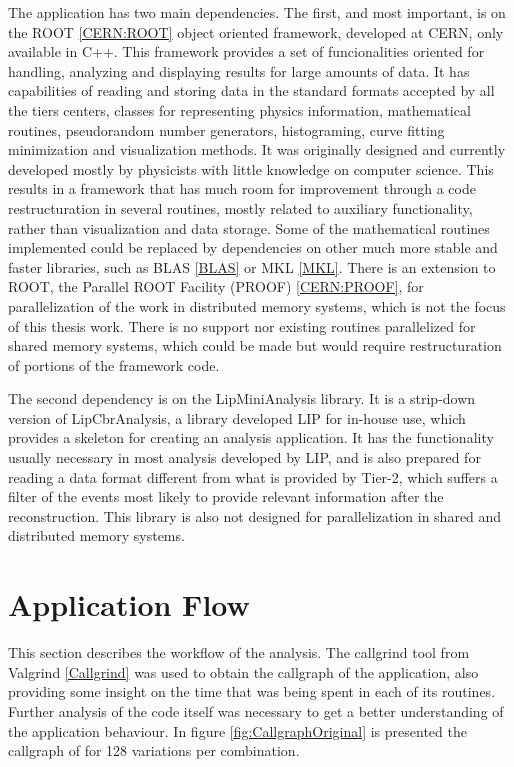 The application has two main dependencies. The first, and most important, is on the ROOT \ref{CERN:ROOT} object oriented framework, developed at CERN, only available in C++. This framework provides a set of funcionalities oriented for handling, analyzing and displaying results for large amounts of data. It has capabilities of reading and storing data in the standard formats accepted by all the tiers centers, classes for representing physics information, mathematical routines, pseudorandom number generators, histograming, curve fitting minimization and visualization methods. It was originally designed and currently developed mostly by physicists with little knowledge on computer science. This results in a framework that has much room for improvement through a code restructuration in several routines, mostly related to auxiliary functionality, rather than visualization and data storage. Some of the mathematical routines implemented could be replaced by dependencies on other much more stable and faster libraries, such as BLAS \ref{BLAS} or MKL \ref{MKL}. There is an extension to ROOT, the Parallel ROOT Facility (PROOF) \ref{CERN:PROOF}, for parallelization of the work in distributed memory systems, which is not the focus of this thesis work. There is no support nor existing routines parallelized for shared memory systems, which could be made but would require restructuration of portions of the framework code.

The second dependency is on the LipMiniAnalysis library. It is a strip-down version of LipCbrAnalysis, a library developed LIP for in-house use, which provides a skeleton for creating an analysis application. It has the functionality usually necessary in most analysis developed by LIP, and is also prepared for reading a data format different from what is provided by Tier-2, which suffers a filter of the events most likely to provide relevant information after the reconstruction. This library is also not designed for parallelization in shared and distributed memory systems.

\section{Application Flow}
\label{Application:Flow}

This section describes the workflow of the \tth analysis. The callgrind tool from Valgrind \ref{Callgrind} was used to obtain the callgraph of the application, also providing some insight on the time that was being spent in each of its routines. Further analysis of the code itself was necessary to get a better understanding of the application behaviour. In figure \ref{fig:CallgraphOriginal} is presented the callgraph of \tth for 128 variations per combination.

